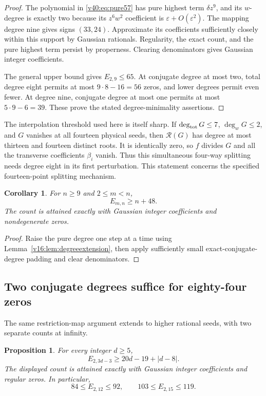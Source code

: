\documentclass[UTF8,11pt]{ctexart}
\newtheorem{prop}[thm]{Proposition}
\newtheorem{cor}[thm]{Corollary}
\theoremstyle{definition}
\numberwithin{equation}{section}
\begin{document}
\begin{proof}
The polynomial in \eqref{v40:eq:pure57} has pure highest term
$\delta z^9$, and its $w$-degree is exactly two because its
$z^6w^2$ coefficient is $\varepsilon+O(\varepsilon^2)$.
The mapping degree nine gives signs $(33,24)$.
Approximate its coefficients sufficiently closely within this
support by Gaussian rationals. Regularity, the exact count,
and the pure highest term persist by properness. Clearing
denominators gives Gaussian integer coefficients.

The general upper bound gives $E_{2,9}\le65$.
At conjugate degree at most two, total degree eight permits
at most $9\cdot8-16=56$ zeros, and lower degrees permit
even fewer. At degree nine, conjugate degree at most one
permits at most $5\cdot9-6=39$. These prove the stated
degree-minimality assertions.
\end{proof}

The interpolation threshold used here is itself sharp.
If $\deg_{\rm tot}G\le7$, $\deg_wG\le2$, and $G$ vanishes
at all fourteen physical seeds, then $\mathcal R(G)$ has
degree at most thirteen and fourteen distinct roots.
It is identically zero, so $f$ divides $G$ and all the
transverse coefficients $\beta_i$ vanish. Thus this
simultaneous four-way splitting needs degree eight in its
first perturbation. This statement concerns the specified
fourteen-point splitting mechanism.

\begin{cor}\label{v40:cor:extension}
For $n\ge9$ and $2\le m<n$,
\[
                              E_{m,n}\ge n+48.
\]
The count is attained exactly with Gaussian integer
coefficients and nondegenerate zeros.
\end{cor}
\begin{proof}
Raise the pure degree one step at a time using
Lemma~\ref{v16:lem:degreeextension}, then apply sufficiently
small exact-conjugate-degree padding and clear denominators.
\end{proof}


\subsection{Two conjugate degrees suffice for eighty-four zeros}
\label{v40:sec:highertransfer}

The same restriction-map argument extends to higher rational
seeds, with two separate counts at infinity.

\begin{prop}\label{v40:prop:highertransfer}
For every integer $d\ge5$,
\begin{equation}\label{v40:eq:highertransfer}
 E_{2,3d-3}\ge20d-19+|d-8|.
\end{equation}
The displayed count is attained exactly with Gaussian integer
coefficients and regular zeros. In particular,
\begin{equation}\label{v40:eq:84103}
                    84\le E_{2,12}\le92,\qquad
                   103\le E_{2,15}\le119.
\end{equation}
\end{prop}
\end{document}
